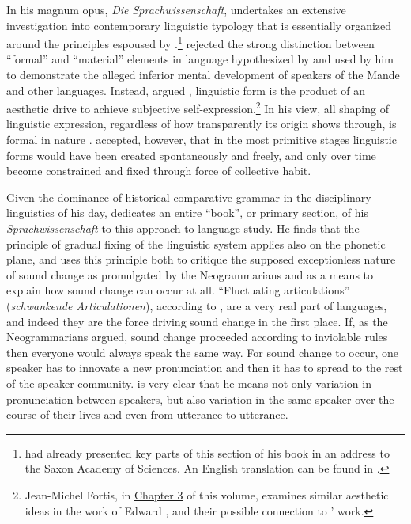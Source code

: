 \documentclass[output=paper]{langscibook}
\begin{document}
In his magnum opus, \emph{Die Sprachwissenschaft}, \citet[341--384]{Gabelentz20161891} undertakes an extensive investigation into contemporary linguistic typology that is essentially organized around the principles espoused by {\Steinthal}.\footnote{\citet{Gabelentz1889} had already presented key parts of this section of his book in an address to the Saxon Academy of Sciences. An English translation can be found in \citet{McElvenny2019}.} {\Gabelentz} rejected the strong distinction between ``formal'' and ``material'' elements in language hypothesized by {\Steinthal} and used by him to demonstrate the alleged inferior mental development of speakers of the Mande and other languages. Instead, argued \citet[380--384]{Gabelentz20161891}, linguistic form is the product of an aesthetic drive to achieve subjective self-expression.\footnote{Jean-Michel Fortis, in \hyperref[chap:fortis]{Chapter 3} of this volume, examines similar aesthetic ideas in the work of Edward {\Sapir}, and their possible connection to {\Gabelentz}' work.} In his view, all shaping of linguistic expression, regardless of how transparently its origin shows through, is formal in nature \citep[see][]{McElvenny2016}. \citet[406--408]{Gabelentz20161891} accepted, however, that in the most primitive stages linguistic forms would have been created spontaneously and freely, and only over time become constrained and fixed through force of collective habit.

Given the dominance of historical-comparative grammar in the disciplinary linguistics of his day, {\Gabelentz} dedicates an entire ``book'', or primary section, of his \emph{Sprachwissenschaft} to this approach to language study. He finds that the principle of gradual fixing of the linguistic system applies also on the phonetic plane, and uses this principle both to critique the supposed exceptionless nature of sound change as promulgated by the Neogrammarians and as a means to explain how sound change can occur at all. ``Fluctuating articulations'' (\emph{schwankende Articulationen}), according to \citet[196]{Gabelentz20161891}, are a very real part of languages, and indeed they are the force driving sound change in the first place. If, as the Neogrammarians argued, sound change proceeded according to inviolable rules then everyone would always speak the same way. For sound change to occur, one speaker has to innovate a new pronunciation and then it has to spread to the rest of the speaker community. \citet[196--197]{Gabelentz20161891} is very clear that he means not only variation in pronunciation between speakers, but also variation in the same speaker over the course of their lives and even from utterance to utterance.
\end{document}
